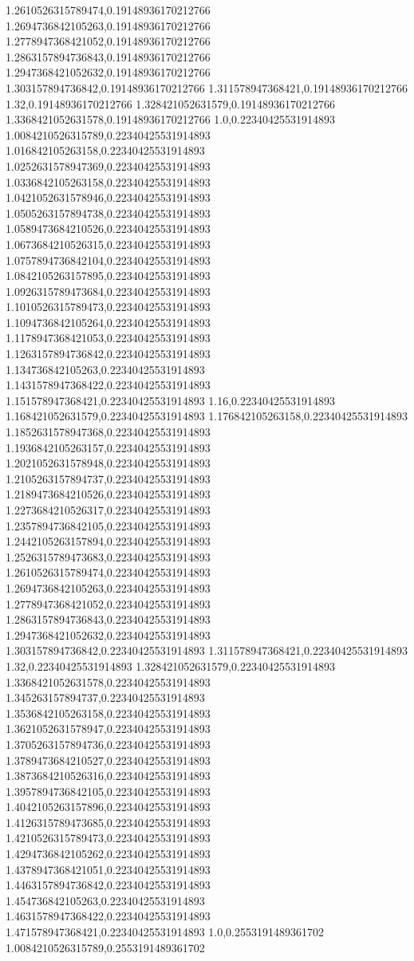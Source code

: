 1.2610526315789474,0.19148936170212766
1.2694736842105263,0.19148936170212766
1.2778947368421052,0.19148936170212766
1.2863157894736843,0.19148936170212766
1.2947368421052632,0.19148936170212766
1.303157894736842,0.19148936170212766
1.311578947368421,0.19148936170212766
1.32,0.19148936170212766
1.328421052631579,0.19148936170212766
1.3368421052631578,0.19148936170212766
1.0,0.22340425531914893
1.0084210526315789,0.22340425531914893
1.016842105263158,0.22340425531914893
1.0252631578947369,0.22340425531914893
1.0336842105263158,0.22340425531914893
1.0421052631578946,0.22340425531914893
1.0505263157894738,0.22340425531914893
1.0589473684210526,0.22340425531914893
1.0673684210526315,0.22340425531914893
1.0757894736842104,0.22340425531914893
1.0842105263157895,0.22340425531914893
1.0926315789473684,0.22340425531914893
1.1010526315789473,0.22340425531914893
1.1094736842105264,0.22340425531914893
1.1178947368421053,0.22340425531914893
1.1263157894736842,0.22340425531914893
1.134736842105263,0.22340425531914893
1.1431578947368422,0.22340425531914893
1.151578947368421,0.22340425531914893
1.16,0.22340425531914893
1.168421052631579,0.22340425531914893
1.176842105263158,0.22340425531914893
1.1852631578947368,0.22340425531914893
1.1936842105263157,0.22340425531914893
1.2021052631578948,0.22340425531914893
1.2105263157894737,0.22340425531914893
1.2189473684210526,0.22340425531914893
1.2273684210526317,0.22340425531914893
1.2357894736842105,0.22340425531914893
1.2442105263157894,0.22340425531914893
1.2526315789473683,0.22340425531914893
1.2610526315789474,0.22340425531914893
1.2694736842105263,0.22340425531914893
1.2778947368421052,0.22340425531914893
1.2863157894736843,0.22340425531914893
1.2947368421052632,0.22340425531914893
1.303157894736842,0.22340425531914893
1.311578947368421,0.22340425531914893
1.32,0.22340425531914893
1.328421052631579,0.22340425531914893
1.3368421052631578,0.22340425531914893
1.345263157894737,0.22340425531914893
1.3536842105263158,0.22340425531914893
1.3621052631578947,0.22340425531914893
1.3705263157894736,0.22340425531914893
1.3789473684210527,0.22340425531914893
1.3873684210526316,0.22340425531914893
1.3957894736842105,0.22340425531914893
1.4042105263157896,0.22340425531914893
1.4126315789473685,0.22340425531914893
1.4210526315789473,0.22340425531914893
1.4294736842105262,0.22340425531914893
1.4378947368421051,0.22340425531914893
1.4463157894736842,0.22340425531914893
1.454736842105263,0.22340425531914893
1.4631578947368422,0.22340425531914893
1.471578947368421,0.22340425531914893
1.0,0.2553191489361702
1.0084210526315789,0.2553191489361702
